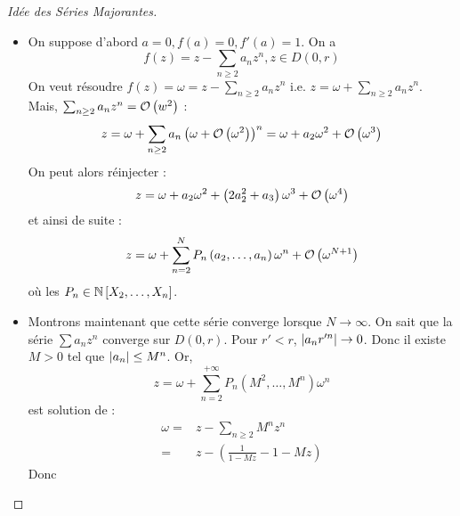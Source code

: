 \documentclass{cours}
\begin{document}
\begin{proof}[Idée des Séries Majorantes]\label{thm:inv_loc_serie_maj}
    \begin{itemize}
        \item On suppose d'abord $a = 0, f\left(a\right) = 0, f'\left(a\right) = 1$. On a 
        \begin{equation*}
            f\left(z\right) = z - \sum_{n \geq 2}a_{n}z^{n}, z\in D\left(0, r\right)
        \end{equation*}
        On veut résoudre $f\left(z\right) = \omega = z - \sum_{n \geq 2} a_{n}z^{n}$ i.e. $z = \omega + \sum_{n \geq 2}a_{n}z^{n}$. Mais, $\sum_{n \geq 2}a_{n}z^{n} = \mathcal{O}\left(w^{2}\right)$ : 
        \begin{equation*}
            z = \omega + \sum_{n \geq 2}a_{n}\left(\omega + \mathcal{O}\left(\omega^{2}\right)\right)^{n} = \omega + a_{2}\omega^{2} + \mathcal{O}\left(\omega^{3}\right)
        \end{equation*}
        On peut alors réinjecter : 
        \begin{equation*}
            z = \omega + a_{2}\omega^{2} + \left(2a_{2}^{2} + a_{3}\right)\omega^{3} + \mathcal{O}\left(\omega^{4}\right)
        \end{equation*}
        et ainsi de suite : 
        \begin{equation*}
            z = \omega + \sum_{n = 2}^{N}P_{n}\left(a_{2}, \ldots, a_{n}\right)\omega^{n} + \mathcal{O}\left(\omega^{N+1}\right)
        \end{equation*}
        où les $P_{n} \in \mathbb{N}\left[X_{2}, \ldots, X_{n}\right]$.
        \item Montrons maintenant que cette série converge lorsque $N \to \infty$. On sait que la série $\sum a_{n}z^{n}$ converge sur $D\left(0, r\right)$. Pour $r' < r$, $\left|a_{n}r'^{n}\right| \to 0$. Donc il existe $M > 0$ tel que $\left|a_{n}\right|\leq M^{n}$. Or, \begin{equation*}z = \omega + \sum_{n = 2}^{+ \infty}P_{n}\left(M^{2}, \ldots, M^{n}\right)\omega^{n}\end{equation*} est solution de :
        \begin{equation*}
            \begin{aligned}
                \omega =& z - \sum_{n \geq 2}M^{n}z^{n}\\
                =& z - \left(\frac{1}{1 - Mz} - 1 - Mz\right)
            \end{aligned}
        \end{equation*}
        Donc 
        \begin{equation*}

\end{equation*}
\end{itemize}
\end{proof}
\end{document}
